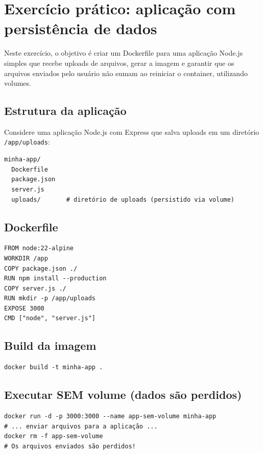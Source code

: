 \section{Exercício prático: aplicação com persistência de dados}

Neste exercício, o objetivo é criar um Dockerfile para uma aplicação Node.js simples que recebe uploads de arquivos, gerar a imagem e garantir que os arquivos enviados pelo usuário não sumam ao reiniciar o container, utilizando volumes.

\subsection{Estrutura da aplicação}

Considere uma aplicação Node.js com Express que salva uploads em um diretório \texttt{/app/uploads}:

\begin{verbatim}
minha-app/
  Dockerfile
  package.json
  server.js
  uploads/       # diretório de uploads (persistido via volume)
\end{verbatim}

\subsection{Dockerfile}

\begin{verbatim}
FROM node:22-alpine
WORKDIR /app
COPY package.json ./
RUN npm install --production
COPY server.js ./
RUN mkdir -p /app/uploads
EXPOSE 3000
CMD ["node", "server.js"]
\end{verbatim}

\subsection{Build da imagem}

\begin{verbatim}
docker build -t minha-app .
\end{verbatim}

\subsection{Executar SEM volume (dados são perdidos)}

\begin{verbatim}
docker run -d -p 3000:3000 --name app-sem-volume minha-app
# ... enviar arquivos para a aplicação ...
docker rm -f app-sem-volume
# Os arquivos enviados são perdidos!
\end{verbatim}

